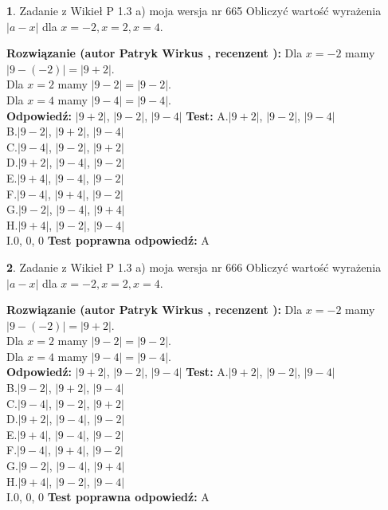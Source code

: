\documentclass[12pt, a4paper]{article}
\theoremstyle{definition} %
\newtheorem{zad}{}
\newcommand{\zadStart}[1]{\begin{zad}#1\newline}
\newcommand{\zadStop}{\end{zad}}
\newcommand{\rozwStart}[2]{\noindent \textbf{Rozwiązanie (autor #1 , recenzent #2): }\newline}
\newcommand{\rozwStop}{\newline}
\newcommand{\odpStart}{\noindent \textbf{Odpowiedź:}\newline}
\newcommand{\odpStop}{\newline}
\newcommand{\testStart}{\noindent \textbf{Test:}\newline}
\newcommand{\testStop}{\newline}
\newcommand{\kluczStart}{\noindent \textbf{Test poprawna odpowiedź:}\newline}
\newcommand{\kluczStop}{\newline}
\begin{document}
\zadStart{Zadanie z Wikieł P 1.3 a) moja wersja nr 665}
Obliczyć wartość wyrażenia $|a - x|$ dla $x=-2,x=2,x=4$.
\zadStop
\rozwStart{Patryk Wirkus}{}
Dla $x = -2$ mamy $|9 - (-2)| = |9 + 2|$.\\
Dla $x = 2$ mamy $|9 - 2| = |9 - 2|$.\\
Dla $x = 4$ mamy $|9 - 4| = |9 - 4|$.\\
\rozwStop
\odpStart
$|9 + 2|$, $|9 - 2|$, $|9 - 4|$
\odpStop
\testStart
A.$|9 + 2|$, $|9 - 2|$, $|9 - 4|$\\
B.$|9 - 2|$, $|9 + 2|$, $|9 - 4|$\\
C.$|9 - 4|$, $|9 - 2|$, $|9 + 2|$\\
D.$|9 + 2|$, $|9 - 4|$, $|9 - 2|$\\
E.$|9 + 4|$, $|9 - 4|$, $|9 - 2|$\\
F.$|9 - 4|$, $|9 + 4|$, $|9 - 2|$\\
G.$|9 - 2|$, $|9 - 4|$, $|9 + 4|$\\
H.$|9 + 4|$, $|9 - 2|$, $|9 - 4|$\\
I.$0$, $0$, $0$
\testStop
\kluczStart
A
\kluczStop



\zadStart{Zadanie z Wikieł P 1.3 a) moja wersja nr 666}
Obliczyć wartość wyrażenia $|a - x|$ dla $x=-2,x=2,x=4$.
\zadStop
\rozwStart{Patryk Wirkus}{}
Dla $x = -2$ mamy $|9 - (-2)| = |9 + 2|$.\\
Dla $x = 2$ mamy $|9 - 2| = |9 - 2|$.\\
Dla $x = 4$ mamy $|9 - 4| = |9 - 4|$.\\
\rozwStop
\odpStart
$|9 + 2|$, $|9 - 2|$, $|9 - 4|$
\odpStop
\testStart
A.$|9 + 2|$, $|9 - 2|$, $|9 - 4|$\\
B.$|9 - 2|$, $|9 + 2|$, $|9 - 4|$\\
C.$|9 - 4|$, $|9 - 2|$, $|9 + 2|$\\
D.$|9 + 2|$, $|9 - 4|$, $|9 - 2|$\\
E.$|9 + 4|$, $|9 - 4|$, $|9 - 2|$\\
F.$|9 - 4|$, $|9 + 4|$, $|9 - 2|$\\
G.$|9 - 2|$, $|9 - 4|$, $|9 + 4|$\\
H.$|9 + 4|$, $|9 - 2|$, $|9 - 4|$\\
I.$0$, $0$, $0$
\testStop
\kluczStart
A
\kluczStop
\end{document}
